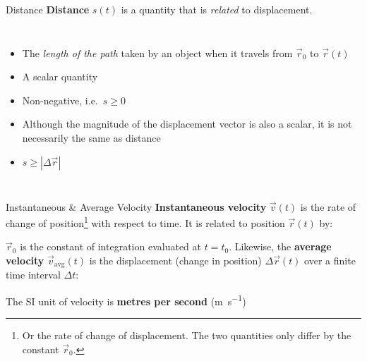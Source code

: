 \documentclass[12pt,compress,aspectratio=169,dvipsnames]{beamer}
\begin{document}
\begin{frame}{Distance}
  \textbf{Distance} $s(t)$ is a quantity that is \emph{related} to displacement.
  \begin{columns}
    \begin{itemize}
    \item The \emph{length of the path} taken by an object when it travels from
      $\vec r_0$ to $\vec r(t)$
    \item A scalar quantity
    \item Non-negative, i.e.\ $s\geq 0$
    \item Although the magnitude of the displacement vector is also a scalar,
      it is not necessarily the same as distance
    \item $s\geq |\Delta\vec r|$
    \end{itemize}
    
  \end{columns}
\end{frame}



\begin{frame}{Instantaneous \& Average Velocity}
  \textbf{Instantaneous velocity} $\vec v(t)$ is the rate of change of
  position\footnote{Or the rate of change of displacement. The two quantities
  only differ by the constant $\vec r_0$.} with respect to time. It is related
  to position $\vec r(t)$ by:


  $\vec r_0$ is the constant of integration evaluated at $t=t_0$. Likewise, the
  \textbf{average velocity} $\vec v_\text{avg}(t)$ is the displacement (change
  in position) $\Delta\vec r(t)$ over a finite time interval $\Delta t$:


  The SI unit of velocity is \textbf{metres per second} (\si{\metre\per\second})
  \vspace{.2in}
\end{frame}
\end{document}

